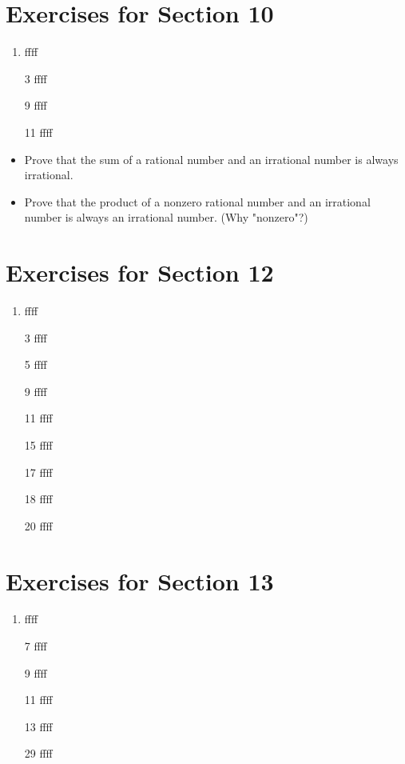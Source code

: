 \documentclass[12pt]{article}
\begin{document}
\section*{Exercises for Section 10}
\begin{enumerate}
	\item ffff
	\item [3] ffff
	\item [9] ffff
	\item [11] ffff
\end{enumerate}
\begin{itemize}
	\item Prove that the sum of a rational number and an irrational number is always irrational.
	\item Prove that the product of a nonzero rational number and an irrational number is always an irrational number. (Why "nonzero"?)
\end{itemize}
\section*{Exercises for Section 12}
\begin{enumerate}
	\item ffff
	\item [3] ffff
	\item [5] ffff
	\item [9] ffff
	\item [11] ffff
	\item [15] ffff
	\item [17] ffff
	\item [18] ffff
	\item [20] ffff
\end{enumerate}
\section*{Exercises for Section 13}
\begin{enumerate}
	\item ffff
	\item [7] ffff
	\item [9] ffff
	\item [11] ffff
	\item [13] ffff
	\item [29] ffff
\end{enumerate}
\end{document}
